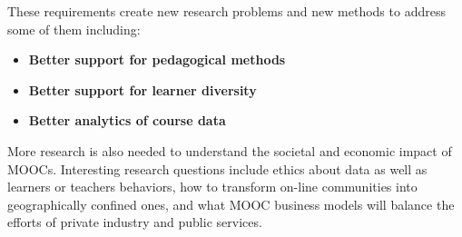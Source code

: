\documentclass[a4paper,UKenglish]{dagman}
\begin{document}
These requirements create new research problems and new methods to address some of them including:
 
\begin{itemize}
\item \textbf{Better support for pedagogical methods}
\item \textbf{Better support for learner diversity}
\item \textbf{Better analytics of course data}

\end{itemize}

More research is also needed to understand the societal and economic impact of MOOCs. Interesting
research questions include ethics about data as well as learners or teachers behaviors, how to
transform on-line communities into geographically confined ones, and what MOOC business models will
balance the efforts of private industry and public services.


  
  
\end{document}
